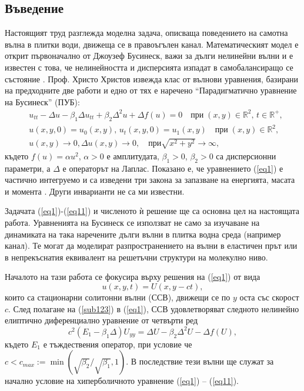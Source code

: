 \documentclass[a4paper]{article}
\newcommand{\be}{\begin{equation}}
\newcommand{\ee}{\end{equation}}
\newcommand{\rf}[1]{(\ref{#1})}
\newcommand{\RR}{\mathbb{R}}
\theoremstyle{remark}
\begin{document}
\begin{large}
\section{Въведение}\label{introduction}
Настоящият труд разглежда моделна задача, описваща поведението на самотна вълна в плитки води, движеща се в правоъгълен канал. Математическият модел е открит първоначално от Джоузеф Бусинеск, важи за дълги нелинейни вълни и е известен с това, че нелинейността и дисперсията изпадат в самобалансиращо се състояние \cite{ref01,ref02}. Проф. Христо Христов \cite{ref1} извежда клас от вълнови уравнения, базирани на предходните две работи и едно от тях е наречено ``Парадигматично уравнение на Бусинеск'' (ПУБ):
\begin{align}
&u_{tt} - \Delta u -\beta_1  \Delta u_{tt} +\beta_2 \Delta ^2 u + \Delta f(u)=0   \quad \text{при} \;  (x,y) \in \RR^2, \, t\in\RR^+,\label{eq1}
\\ \nonumber &u(x,y,0)=u_0(x,y), \, u_t(x,y,0)=u_1(x,y)   \quad\text{при} \; (x,y) \in \RR^2,
\\  &u(x,y) \rightarrow 0,  \Delta u(x,y) \rightarrow 0 ,  \quad \text{при}  \sqrt{x^2 + y^2} \rightarrow \infty, \label{eq11}
\end{align}
където $f(u)=\alpha u^2$, $\alpha>0$ е амплитудата, $\beta_1>0$, $\beta_2>0$ са дисперсионни параметри, а $\Delta$ е операторът на Лаплас. Показано е, че уравнението \rf{eq1} е частично интегруемо и са изведени три закона за запазване на енергията, масата и момента \cite{ref1, ref159}. Други инварианти не са ми известни. 

Задачата \rf{eq1}-\rf{eq11} и численото ѝ решение ще са основна цел на настоящата работа. Уравненията на Бусинеск се използват не само за изучаване на динамиката на така наречените дълги вълни в плитка водна среда (например канал). Те могат да моделират разпространението на вълни в еластичен прът или в непрекъснатия еквивалент на решетъчни структури на молекулно ниво.

Началото на тази работа се фокусира върху решения на \rf{eq1} от вида 
\be\label{sub123}
u(x,y,t)=U(x,y-ct),
\ee
които са стационарни солитонни вълни (ССВ), движещи се по $y$ оста със скорост $c$. След полагане на \rf{sub123} в \rf{eq1}, ССВ удовлетворяват следното нелинейно елиптично диференциално уравнение от четвърти ред
\begin{equation}\label{eq2}
c^2 (E_1-\beta_1 \Delta) U_{yy} = \Delta U -\beta_2 \Delta^2 U - \Delta f(U),
\end{equation}
където $E_1$ е тъждествения оператор, при условие че $c < c_{max}:=\min (\sqrt{\beta_2}/ \sqrt{\beta_1},1)$. В последствие тези вълни ще служат за начално условие на хиперболичното уравнение \rf{eq1} -- \rf{eq11}. 


\end{large}
\end{document}
